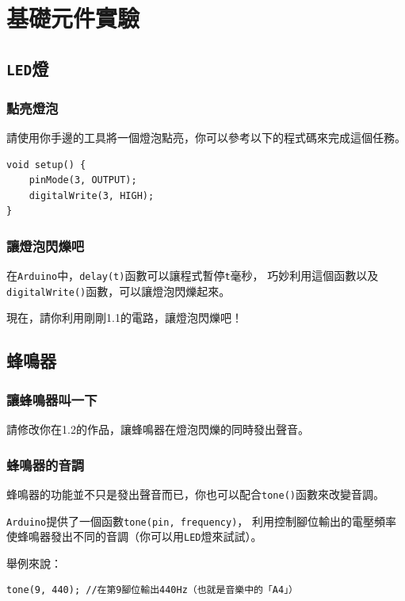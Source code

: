\documentclass[12pt,a4paper]{article}
\begin{document}


\section{基礎元件實驗}

\subsection{\texttt{LED}燈}

\subsubsection{點亮燈泡}
請使用你手邊的工具將一個燈泡點亮，你可以參考以下的程式碼來完成這個任務。
\begin{lstlisting}
void setup() {
    pinMode(3, OUTPUT);
    digitalWrite(3, HIGH);
}
\end{lstlisting}

\subsubsection{讓燈泡閃爍吧}
在\texttt{Arduino}中，\texttt{delay(t)}函數可以讓程式暫停\texttt{t}毫秒，
巧妙利用這個函數以及\texttt{digitalWrite()}函數，可以讓燈泡閃爍起來。

現在，請你利用剛剛1.1的電路，讓燈泡閃爍吧！

\subsection{蜂鳴器}

\subsubsection{讓蜂鳴器叫一下}
請修改你在1.2的作品，讓蜂鳴器在燈泡閃爍的同時發出聲音。

\subsubsection{蜂鳴器的音調}
蜂鳴器的功能並不只是發出聲音而已，你也可以配合\texttt{tone()}函數來改變音調。

\texttt{Arduino}提供了一個函數\texttt{tone(pin, frequency)}，
利用控制腳位輸出的電壓頻率使蜂鳴器發出不同的音調（你可以用\texttt{LED}燈來試試）。

舉例來說：
\begin{lstlisting}
tone(9, 440); //在第9腳位輸出440Hz（也就是音樂中的「A4」）
\end{lstlisting}
\end{document}
